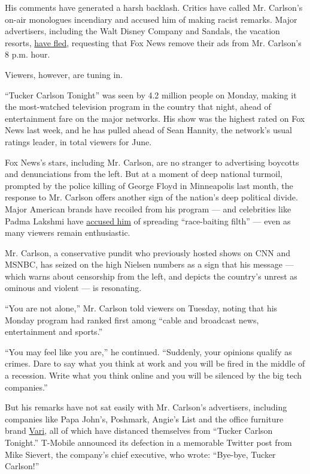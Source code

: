 His comments have generated a harsh backlash. Critics have called Mr.
Carlson's on-air monologues incendiary and accused him of making racist
remarks. Major advertisers, including the Walt Disney Company and
Sandals, the vacation resorts,
\href{https://www.nytimes.com/2020/06/12/business/media/tucker-carlson-fox-news-advertisers.html}{have
fled}, requesting that Fox News remove their ads from Mr. Carlson's 8
p.m. hour.

Viewers, however, are tuning in.

``Tucker Carlson Tonight'' was seen by 4.2 million people on Monday,
making it the most-watched television program in the country that night,
ahead of entertainment fare on the major networks. His show was the
highest rated on Fox News last week, and he has pulled ahead of Sean
Hannity, the network's usual ratings leader, in total viewers for June.

Fox News's stars, including Mr. Carlson, are no stranger to advertising
boycotts and denunciations from the left. But at a moment of deep
national turmoil, prompted by the police killing of George Floyd in
Minneapolis last month, the response to Mr. Carlson offers another sign
of the nation's deep political divide. Major American brands have
recoiled from his program --- and celebrities like Padma Lakshmi have
\href{https://twitter.com/PadmaLakshmi/status/1270194782002913280}{accused
him} of spreading ``race-baiting filth'' --- even as many viewers remain
enthusiastic.

Mr. Carlson, a conservative pundit who previously hosted shows on CNN
and MSNBC, has seized on the high Nielsen numbers as a sign that his
message --- which warns about censorship from the left, and depicts the
country's unrest as ominous and violent --- is resonating.

``You are not alone,'' Mr. Carlson told viewers on Tuesday, noting that
his Monday program had ranked first among ``cable and broadcast news,
entertainment and sports.''

``You may feel like you are,'' he continued. ``Suddenly, your opinions
qualify as crimes. Dare to say what you think at work and you will be
fired in the middle of a recession. Write what you think online and you
will be silenced by the big tech companies.''

But his remarks have not sat easily with Mr. Carlson's advertisers,
including companies like Papa John's, Poshmark, Angie's List and the
office furniture brand
\href{https://twitter.com/WorkWithVari/status/1270851022555172864?s=20}{Vari},
all of which have distanced themselves from ``Tucker Carlson Tonight.''
T-Mobile announced its defection in a memorable Twitter post from Mike
Sievert, the company's chief executive, who wrote: ``Bye-bye, Tucker
Carlson!''


